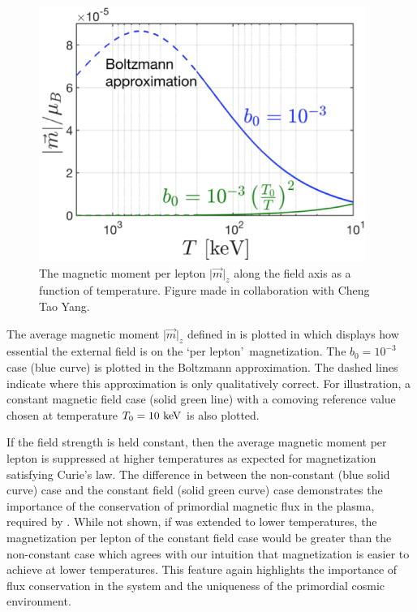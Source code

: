 \begin{figure}[ht]
 \centering
 \includegraphics[clip, trim=0.0cm 0.0cm 0.0cm 0.0cm,width=0.95\textwidth]{plots/chap04cosmo/thesis_perlepton.png}
 \caption{The magnetic moment per lepton $\vert\vec{m}\vert_{z}$ along the field axis as a function of temperature. Figure made in collaboration with Cheng Tao Yang.}
 \label{fig:momentperlepton}
\end{figure}

The average magnetic moment $\vert\vec{m}\vert_{z}$ defined in  is plotted in  which displays how essential the external field is on the \lq per lepton\rq\ magnetization. The $b_{0}=10^{-3}$ case (blue curve) is plotted in the Boltzmann approximation. The dashed lines indicate where this approximation is only qualitatively correct. For illustration, a constant magnetic field case (solid green line) with a comoving reference value chosen at temperature $T_{0}=10\text{ keV}$ is also plotted.

If the field strength is held constant, then the average magnetic moment per lepton is suppressed at higher temperatures as expected for magnetization satisfying Curie's law. The difference in  between the non-constant (blue solid curve) case and the constant field (solid green curve) case demonstrates the importance of the conservation of primordial magnetic flux in the plasma, required by . While not shown, if  was extended to lower temperatures, the magnetization per lepton of the constant field case would be greater than the non-constant case which agrees with our intuition that magnetization is easier to achieve at lower temperatures. This feature again highlights the importance of flux conservation in the system and the uniqueness of the primordial cosmic environment.

